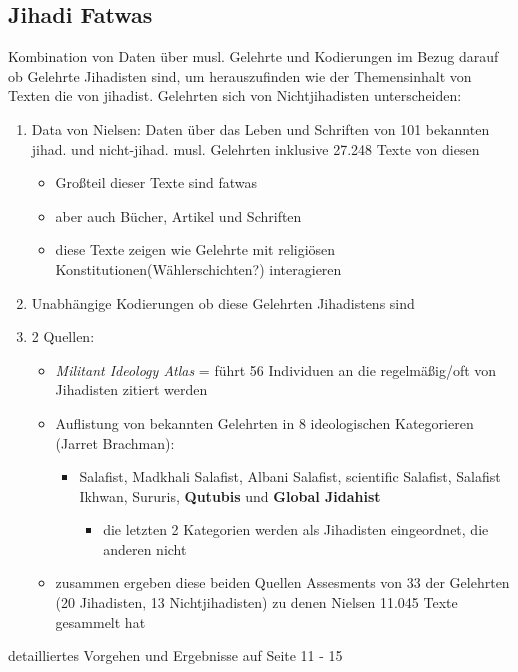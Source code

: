 \documentclass[11pt]{article}
\begin{document}
\subsection{Jihadi Fatwas}
\label{sec:org3fb0c25}
Kombination von Daten über musl. Gelehrte und Kodierungen im Bezug darauf ob Gelehrte Jihadisten sind, um herauszufinden wie der Themensinhalt von Texten die von jihadist. Gelehrten sich von Nichtjihadisten unterscheiden:
\begin{enumerate}
\item Data von Nielsen: Daten über das Leben und Schriften von 101 bekannten jihad. und nicht-jihad. musl. Gelehrten inklusive 27.248 Texte von diesen
\begin{itemize}
\item Großteil dieser Texte sind fatwas
\item aber auch Bücher, Artikel und Schriften
\item diese Texte zeigen wie Gelehrte mit religiösen Konstitutionen(Wählerschichten?) interagieren
\end{itemize}
\item Unabhängige Kodierungen ob diese Gelehrten Jihadistens sind
\item 2 Quellen:
\begin{itemize}
\item \emph{Militant Ideology Atlas} = führt 56 Individuen an die regelmäßig/oft von Jihadisten zitiert werden
\item Auflistung von bekannten Gelehrten in 8 ideologischen Kategorieren (Jarret Brachman):
\begin{itemize}
\item Salafist, Madkhali Salafist, Albani Salafist, scientific Salafist, Salafist Ikhwan, Sururis, \textbf{Qutubis} und \textbf{Global Jidahist}
\begin{itemize}
\item die letzten 2 Kategorien werden als Jihadisten eingeordnet, die anderen nicht
\end{itemize}
\end{itemize}
\item zusammen ergeben diese beiden Quellen Assesments von 33 der Gelehrten (20 Jihadisten, 13 Nichtjihadisten) zu denen Nielsen 11.045 Texte gesammelt hat
\end{itemize}
\end{enumerate}

detailliertes Vorgehen und Ergebnisse auf Seite 11 - 15
\end{document}
